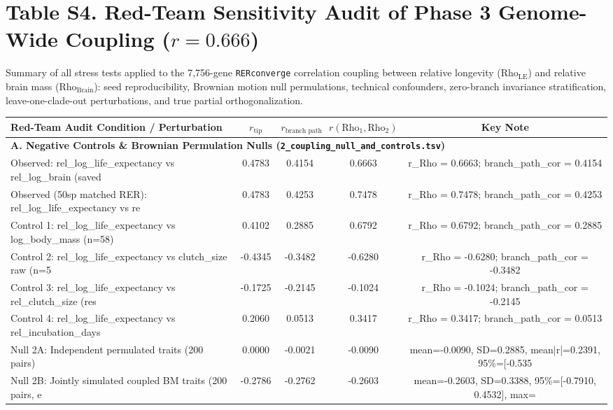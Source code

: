 \documentclass[9pt,a4paper]{article}
\begin{document}
\section*{Table S4. Red-Team Sensitivity Audit of Phase 3 Genome-Wide Coupling ($r = 0.666$)}
Summary of all stress tests applied to the 7,756-gene \texttt{RERconverge} correlation coupling between relative longevity ($\text{Rho}_{\text{LE}}$) and relative brain mass ($\text{Rho}_{\text{Brain}}$): seed reproducibility, Brownian motion null permulations, technical confounders, zero-branch invariance stratification, leave-one-clade-out perturbations, and true partial orthogonalization.
\begin{longtable}{p{6.5cm}cccc}
\toprule
\textbf{Red-Team Audit Condition / Perturbation} & \textbf{$r_{\text{tip}}$} & \textbf{$r_{\text{branch path}}$} & \textbf{$r(\text{Rho}_1,\text{Rho}_2)$} & \textbf{Key Note} \\
\midrule\endhead
\multicolumn{5}{l}{\textbf{A. Negative Controls \& Brownian Permulation Nulls (\texttt{2\_coupling\_null\_and\_controls.tsv})}} \\
Observed: rel\_log\_life\_expectancy vs rel\_log\_brain (saved  & 0.4783 & 0.4154 & 0.6663 & \scriptsize r\_Rho = 0.6663; branch\_path\_cor = 0.4154 \\
Observed (50sp matched RER): rel\_log\_life\_expectancy vs re & 0.4783 & 0.4253 & 0.7478 & \scriptsize r\_Rho = 0.7478; branch\_path\_cor = 0.4253 \\
Control 1: rel\_log\_life\_expectancy vs log\_body\_mass (n=58) & 0.4102 & 0.2885 & 0.6792 & \scriptsize r\_Rho = 0.6792; branch\_path\_cor = 0.2885 \\
Control 2: rel\_log\_life\_expectancy vs clutch\_size raw (n=5 & -0.4345 & -0.3482 & -0.6280 & \scriptsize r\_Rho = -0.6280; branch\_path\_cor = -0.3482 \\
Control 3: rel\_log\_life\_expectancy vs rel\_clutch\_size (res & -0.1725 & -0.2145 & -0.1024 & \scriptsize r\_Rho = -0.1024; branch\_path\_cor = -0.2145 \\
Control 4: rel\_log\_life\_expectancy vs rel\_incubation\_days  & 0.2060 & 0.0513 & 0.3417 & \scriptsize r\_Rho = 0.3417; branch\_path\_cor = 0.0513 \\
Null 2A: Independent permulated traits (200 pairs) & 0.0000 & -0.0021 & -0.0090 & \scriptsize mean=-0.0090, SD=0.2885, mean|r|=0.2391, 95\%=[-0.535 \\
Null 2B: Jointly simulated coupled BM traits (200 pairs, e & -0.2786 & -0.2762 & -0.2603 & \scriptsize mean=-0.2603, SD=0.3388, 95\%=[-0.7910, 0.4532], max= \\

\end{longtable}
\end{document}
